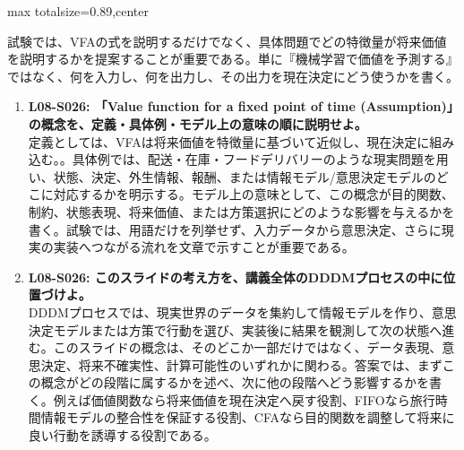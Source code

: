 \begin{minipage}[t]{0.58\textwidth}
\begin{adjustbox}{max totalsize={\textwidth}{0.89\textheight},center}
\begin{minipage}{\textwidth}
試験では、VFAの式を説明するだけでなく、具体問題でどの特徴量が将来価値を説明するかを提案することが重要である。単に『機械学習で価値を予測する』ではなく、何を入力し、何を出力し、その出力を現在決定にどう使うかを書く。\par{}\begin{enumerate}\item \textbf{L08-S026: 「Value function for a fixed point of time (Assumption)」の概念を、定義・具体例・モデル上の意味の順に説明せよ。}\\定義としては、VFAは将来価値を特徴量に基づいて近似し、現在決定に組み込む。。具体例では、配送・在庫・フードデリバリーのような現実問題を用い、状態、決定、外生情報、報酬、または情報モデル/意思決定モデルのどこに対応するかを明示する。モデル上の意味として、この概念が目的関数、制約、状態表現、将来価値、または方策選択にどのような影響を与えるかを書く。試験では、用語だけを列挙せず、入力データから意思決定、さらに現実の実装へつながる流れを文章で示すことが重要である。\item \textbf{L08-S026: このスライドの考え方を、講義全体のDDDMプロセスの中に位置づけよ。}\\DDDMプロセスでは、現実世界のデータを集約して情報モデルを作り、意思決定モデルまたは方策で行動を選び、実装後に結果を観測して次の状態へ進む。このスライドの概念は、そのどこか一部だけではなく、データ表現、意思決定、将来不確実性、計算可能性のいずれかに関わる。答案では、まずこの概念がどの段階に属するかを述べ、次に他の段階へどう影響するかを書く。例えば価値関数なら将来価値を現在決定へ戻す役割、FIFOなら旅行時間情報モデルの整合性を保証する役割、CFAなら目的関数を調整して将来に良い行動を誘導する役割である。\end{enumerate}
\end{minipage}
\end{adjustbox}
\end{minipage}


